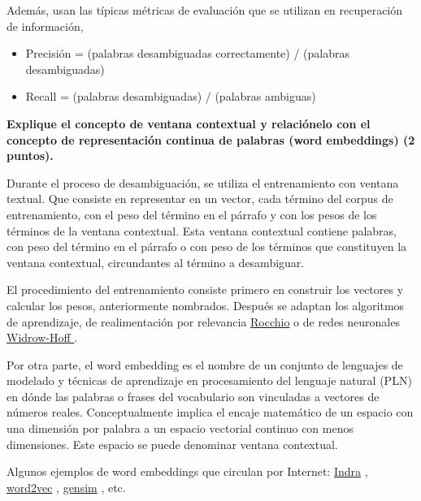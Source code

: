 \documentclass[11pt]{exam}
\begin{document}
\begin{questions}
Además, usan las típicas métricas de evaluación que se utilizan en recuperación de información,

\begin{itemize}
	\item Precisión = (palabras desambiguadas correctamente) / (palabras desambiguadas)
	\item Recall = (palabras desambiguadas) / (palabras ambiguas)
\end{itemize}

{\bf \question Explique el concepto de ventana contextual y relaciónelo con el concepto de representación continua de palabras (word embeddings) (2 puntos).}

Durante el proceso de desambiguación, se utiliza el entrenamiento con ventana textual. Que consiste en representar en un vector, cada término del corpus de entrenamiento, con el peso del término en el párrafo y con los pesos de los términos de la ventana contextual. Esta ventana contextual contiene palabras, con peso del término en el párrafo o con peso de los términos que constituyen la ventana contextual, circundantes al término a desambiguar.

El procedimiento del entrenamiento consiste primero en construir los vectores y calcular los pesos, anteriormente nombrados. Después se adaptan los algoritmos de aprendizaje, de realimentación por relevancia \href{https://nlp.stanford.edu/IR-book/html/htmledition/rocchio-classification-1.html}{Rocchio} o de redes neuronales \href{https://en.wikipedia.org/wiki/Least_mean_squares_filter}{Widrow-Hoff } .

Por otra parte, el word embedding es el nombre de un conjunto de lenguajes de modelado y técnicas de aprendizaje en procesamiento del lenguaje natural (PLN) en dónde las palabras o frases del vocabulario son vinculadas a vectores de números reales. Conceptualmente implica el encaje matemático de un espacio con una dimensión por palabra a un espacio vectorial continuo con menos dimensiones. Este espacio se puede denominar ventana contextual.

Algunos ejemplos de word embeddings que circulan por Internet: \href{https://github.com/Lambda-3/Indra}{Indra} , \href{https://code.google.com/archive/p/word2vec/}{word2vec} , \href{https://radimrehurek.com/gensim/}{gensim} , etc.
	
\end{questions}
	
\end{document}
